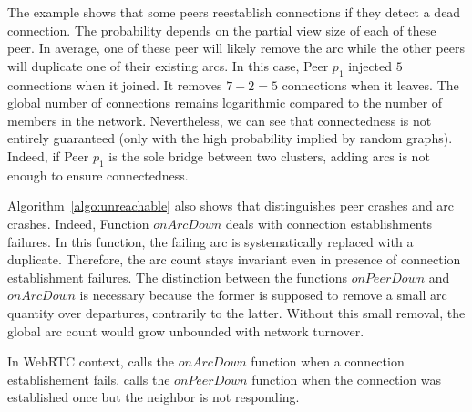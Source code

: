 The example shows that some peers reestablish connections if they detect a dead
connection. The probability depends on the partial view size of each of these
peer. In average, one of these peer will likely remove the arc while the other
peers will duplicate one of their existing arcs. In this case, Peer $p_1$
injected $5$ connections when it joined. It removes $7-2 =5 $ connections when
it leaves. The global number of connections remains logarithmic compared to the
number of members in the network. Nevertheless, we can see that connectedness
is not entirely guaranteed (only with the high probability implied by random
graphs). Indeed, if Peer $p_1$ is the sole bridge between two clusters, adding
arcs is not enough to ensure connectedness.

Algorithm~\ref{algo:unreachable} also shows that \SPRAY distinguishes peer
crashes and arc crashes. Indeed, Function $onArcDown$ deals with connection
establishments failures. In this function, the failing arc is systematically
replaced with a duplicate. Therefore, the arc count stays invariant even in
presence of connection establishment failures. The distinction between the
functions $onPeerDown$ and $onArcDown$ is necessary because the former is
supposed to remove a small arc quantity over departures, contrarily to the
latter. Without this small removal, the global arc count would grow unbounded
with network turnover.

In WebRTC context, \SPRAY calls the $onArcDown$ function when a connection
establishement fails. \SPRAY calls the $onPeerDown$ function when the
connection was established once but the neighbor is not responding.



